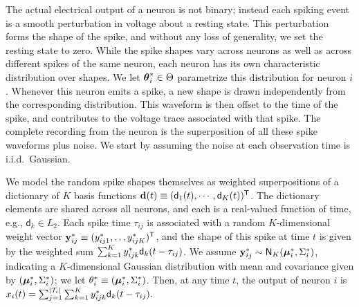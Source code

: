 The actual electrical output of a neuron is not binary; instead each spiking event is a smooth perturbation in voltage about a
resting state. This perturbation forms the shape of the spike, and without any loss of generality, we set the resting state to zero. 
While the spike shapes vary across neurons as well as across different spikes of the same neuron, each 
neuron has its own characteristic distribution over shapes. 
We let $\boldsymbol{\theta}^*_i \in \Theta$ parametrize this distribution for neuron $i$.
Whenever this neuron emits a 
spike, a new shape is drawn independently from the corresponding distribution. %
This waveform is then offset to the time of the spike, and contributes to the voltage trace associated with that spike. The complete recording from
the neuron is the superposition of all these spike waveforms plus noise.  
We start by assuming the noise at each observation time is i.i.d.\ Gaussian.

We model the random spike shapes themselves as weighted superpositions of a dictionary of $K$ basis functions $\mathsf{\mathbf{d}}(t) \equiv (\mathsf{d}_1(t), \cdots, \mathsf{d}_K(t))^{\mathsf{T}}$. The
dictionary elements are shared across all neurons, and each is a real-valued function of time, e.g., $\mathsf{d}_k \in L_2$.
Each spike time $\tau_{ij}$ is associated with a random $K$-dimensional weight vector $\mathbf{y}^*_{ij} \equiv (y^*_{ij1}, \ldots y^*_{ijK})^{\mathsf{T}}$, and the 
shape of this spike at time $t$ is given by the weighted sum $\sum_{k=1}^K y^*_{ijk} \mathsf{d}_k(t-\tau_{ij})$. We assume $\mathbf{y}^*_{ij} \sim \mathsf{N}_K(\boldsymbol{\mu}^*_i, \Sigma^*_i)$, indicating a $K$-dimensional 
Gaussian distribution with mean and covariance given by $(\boldsymbol{\mu}^*_i, \Sigma^*_i)$; we let $ \theta^*_i \equiv (\boldsymbol{\mu}^*_i, \Sigma^*_i) $.   Then, at any time $t$, the output of neuron $i$ is
$
  x_{i}(t) = \sum_{j=1}^{|\mathcal{T}_i|} \sum_{k=1}^K y^*_{ijk} \mathsf{d}_k(t - \tau_{ij}).
$

